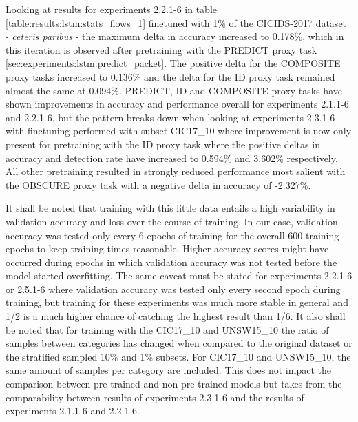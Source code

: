 Looking at results for experiments 2.2.1-6 in table \ref{table:results:lstm:stats_flows_1} finetuned with 1\% of the CICIDS-2017 dataset - \textit{ceteris paribus} - the maximum delta in accuracy increased to 0.178\%, which in this iteration is observed after pretraining with the PREDICT proxy task \ref{sec:experiments:lstm:predict_packet}. The positive delta for the COMPOSITE proxy tasks increased to 0.136\% and the delta for the ID proxy task remained almost the same at 0.094\%. PREDICT, ID and COMPOSITE proxy tasks have shown improvements in accuracy and performance overall for experiments 2.1.1-6 and 2.2.1-6, but the pattern breaks down when looking at experiments 2.3.1-6 with finetuning performed with subset CIC17\_10 where improvement is now only present for pretraining with the ID proxy task where the positive deltas in accuracy and detection rate have increased to 0.594\% and 3.602\% respectively. All other pretraining resulted in strongly reduced performance most salient with the OBSCURE proxy task with a negative delta in accuracy of -2.327\%. \par 
It shall be noted that training with this little data entails a high variability in validation accuracy and loss over the course of training. In our case, validation accuracy was tested only every 6 epochs of training for the overall 600 training epochs to keep training times reasonable. Higher accuracy scores might have occurred during
epochs in which validation accuracy was not tested before the model started overfitting. The same caveat must be stated for experiments 2.2.1-6 or 2.5.1-6 where validation accuracy was tested only every second epoch during training, but training for these experiments was much more stable in general and 1/2 is a much higher chance of catching the highest result than 1/6. It also shall be noted that for training with the CIC17\_10 and UNSW15\_10 the ratio of samples between categories has changed when compared to the original dataset or the stratified sampled 10\% and 1\% subsets. For CIC17\_10 and UNSW15\_10, the same amount of samples per category are included. This does not impact the comparison between pre-trained and non-pre-trained models but takes from the comparability between results of experiments 2.3.1-6 and the results of experiments 2.1.1-6 and 2.2.1-6. \par

